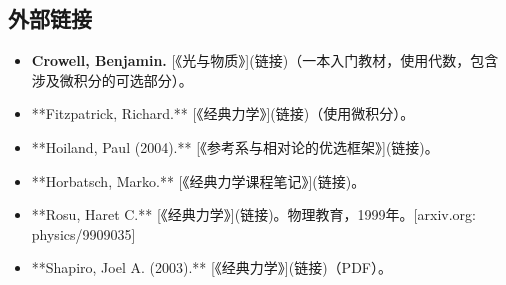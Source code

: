 \subsection{外部链接}
\begin{itemize}
\item \textbf{Crowell, Benjamin.} [《光与物质》](链接)（一本入门教材，使用代数，包含涉及微积分的可选部分）。  
\item **Fitzpatrick, Richard.** [《经典力学》](链接)（使用微积分）。  
\item **Hoiland, Paul (2004).** [《参考系与相对论的优选框架》](链接)。  
\item **Horbatsch, Marko.** [《经典力学课程笔记》](链接)。  
\item **Rosu, Haret C.** [《经典力学》](链接)。物理教育，1999年。[arxiv.org: physics/9909035]  
\item **Shapiro, Joel A. (2003).** [《经典力学》](链接)（PDF）。
\end{itemize}